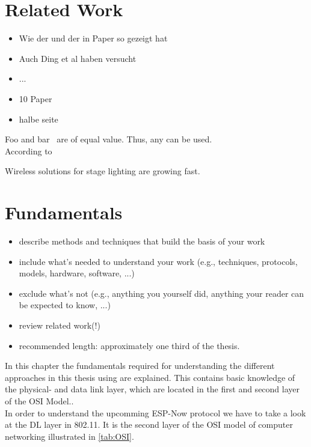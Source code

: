 \documentclass[]{ccs-thesis}
\begin{document}
\chapter{Related Work}
\begin{itemize}
	\item Wie der und der in Paper so gezeigt hat 
	\item Auch Ding et al haben versucht
	\item ...
	\item 10 Paper
	\item halbe seite
\end{itemize}

Foo and bar~\cite{LowCostMicrocontroller} are of equal value. Thus, any can be used.\\
According to~\cite{akyildiz2002survey}

Wireless solutions for stage lighting are growing fast. 


\chapter{Fundamentals}
\label{sec:fundamentals}

\begin{itemize}
	\item describe methods and techniques that build the basis of your work
	\item include what's needed to understand your work (e.g., techniques, protocols, models, hardware, software, ...)
	\item exclude what's not (e.g., anything you yourself did, anything your reader can be expected to know, ...)
	\item review related work(!)
	\item recommended length: approximately one third of the thesis.
\end{itemize}

In this chapter the fundamentals required for understanding the different approaches 
in this thesis using are explained.
This contains basic knowledge of the physical- and data link layer,
which are located in the first and second layer of the \ac{OSI} Model..\\
In order to understand the upcomming ESP-Now protocol we have to take a look at the \ac{DL} layer in 802.11.
It is the second layer of the \ac{OSI} model of computer networking illustrated in \cref{tab:OSI}.
\end{document}
